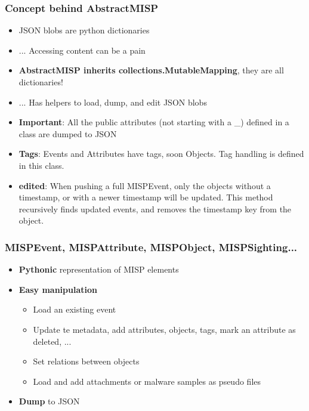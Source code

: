 \begin{frame}[fragile]
    \frametitle{Concept behind AbstractMISP}
    \begin{itemize}
        \item JSON blobs are python dictionaries
        \item ... Accessing content can be a pain
        \item {\bf AbstractMISP inherits collections.MutableMapping}, they are all dictionaries!
        \item ... Has helpers to load, dump, and edit JSON blobs
        \item {\bf Important}: All the public attributes (not starting with a \_) defined in a class are dumped to JSON
        \item {\bf Tags}: Events and Attributes have tags, soon Objects. Tag handling is defined in this class.
        \item {\bf edited}: When pushing a full MISPEvent, only the objects without a timestamp,
            or with a newer timestamp will be updated. This method recursively finds updated events,
            and removes the timestamp key from the object.
    \end{itemize}
\end{frame}

\begin{frame}[fragile]
    \frametitle{MISPEvent, MISPAttribute, MISPObject, MISPSighting...}
    \begin{itemize}
        \item {\bf Pythonic} representation of MISP elements
        \item {\bf Easy manipulation}
        \begin{itemize}
            \item Load an existing event
            \item Update te metadata, add attributes, objects, tags, mark an attribute as deleted, ...
            \item Set relations between objects
            \item Load and add attachments or malware samples as pseudo files
        \end{itemize}
        \item {\bf Dump} to JSON
    \end{itemize}
\end{frame}

